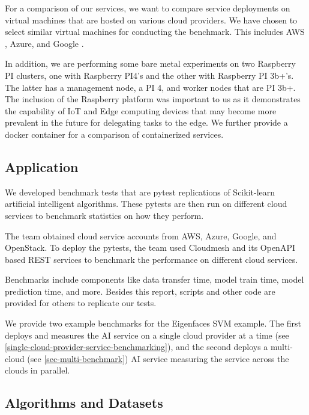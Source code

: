 For a comparison of our services, we want to compare service deployments on virtual machines that are hosted on various cloud providers. We have chosen to select similar virtual machines for conducting the benchmark. This includes AWS \cite{www-aws}, Azure\cite{www-azure}, and Google \cite{www-google}. 

In addition, we are performing some bare metal experiments on two Raspberry PI clusters, one with Raspberry PI4's and the other with Raspberry PI 3b+'s. The latter has a management node, a PI 4, and worker nodes that are PI 3b+. The inclusion of the Raspberry platform was important to us as it demonstrates the capability of IoT and Edge computing devices that may become more prevalent in the future for delegating tasks to the edge. We further provide a docker container for a comparison of containerized services.


\subsection{Application}

We developed benchmark tests that are pytest replications of Scikit-learn artificial intelligent algorithms. These pytests are then run on different cloud services to benchmark statistics on how they perform. 

The team obtained cloud service
accounts from AWS, Azure, Google, and OpenStack. To deploy the pytests,
the team used Cloudmesh and its OpenAPI based REST services to
benchmark the performance on different cloud services. 

Benchmarks include components like data transfer time, model train time, model prediction time, and more. Besides this report, scripts and other code are provided for others to replicate our tests.

We provide two example benchmarks for the Eigenfaces SVM example. The
first deploys and measures the AI service on a single cloud provider at
a time (see \ref{single-cloud-provider-service-benchmarking}), and the second deploys a multi-cloud (see \ref{sec-multi-benchmark}) AI service measuring the service across the clouds in parallel.


\subsection{Algorithms and Datasets}
\label{sec:algorithms-and-datasets}

